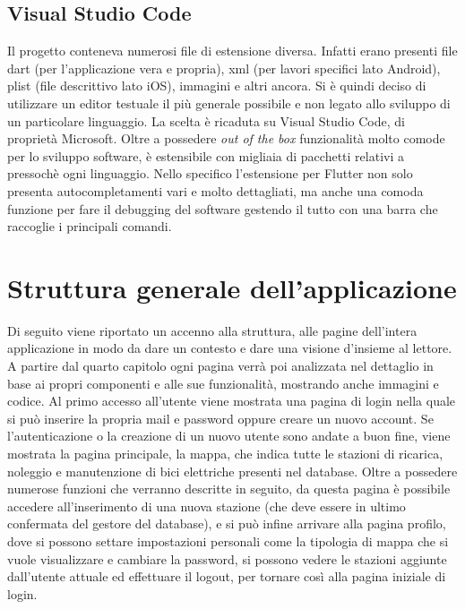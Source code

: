 	\subsection{Visual Studio Code}
	Il progetto conteneva numerosi file di estensione diversa. Infatti erano
	presenti file dart (per l'applicazione vera e propria), xml (per lavori
	specifici lato Android), plist (file descrittivo lato iOS), immagini e altri
	ancora. Si è quindi deciso di utilizzare un editor testuale il più generale
	possibile e non legato allo sviluppo di un particolare linguaggio. La
	scelta è ricaduta su Visual Studio Code, di proprietà Microsoft. Oltre a
	possedere \textit{out of the box} funzionalità molto comode per lo sviluppo
	software, è estensibile con migliaia di pacchetti relativi a pressochè ogni
	linguaggio. Nello specifico l'estensione per Flutter non solo presenta
	autocompletamenti vari e molto dettagliati, ma anche una comoda funzione per
	fare il debugging del software gestendo il tutto con una barra che raccoglie i
	principali comandi. 

	\section{Struttura generale dell'applicazione}
	Di seguito viene riportato un accenno alla struttura, alle pagine
	dell'intera applicazione in modo da dare un contesto e dare una visione
	d'insieme al lettore. A partire dal quarto capitolo ogni pagina verrà poi
	analizzata nel dettaglio in base ai propri componenti e alle sue
	funzionalità, mostrando anche immagini e codice. \newline
	Al primo accesso all'utente viene mostrata una pagina di login nella quale
	si può inserire la propria mail e password oppure creare un nuovo account.
	Se l'autenticazione o la creazione di un nuovo utente sono andate a buon
	fine, viene mostrata la pagina principale, la mappa, che indica tutte le
	stazioni di ricarica, noleggio e manutenzione di bici elettriche presenti
	nel database. Oltre a possedere numerose funzioni che verranno descritte in
	seguito, da questa pagina è possibile accedere all'inserimento di
	una nuova stazione (che deve essere in ultimo confermata del gestore del
	database), e si può infine arrivare alla pagina profilo, dove si possono
	settare impostazioni personali come la tipologia di mappa che si vuole
	visualizzare e cambiare la password, si possono vedere le stazioni aggiunte
	dall'utente attuale ed effettuare il logout, per tornare così alla pagina
	iniziale di login. 	
	
%